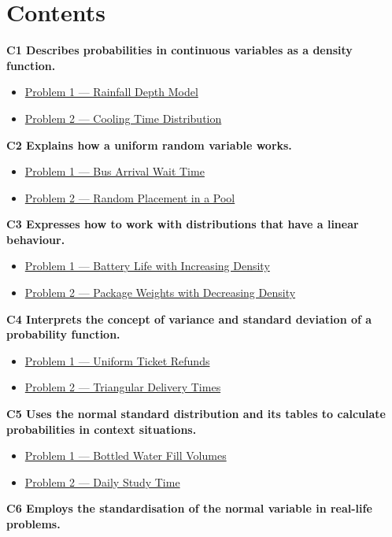 


	
	\section*{Contents}
	\noindent\textbf{C1 Describes probabilities in continuous variables as a density function.}
	\begin{itemize}
		\item \hyperlink{c1-ex1}{Problem 1 — Rainfall Depth Model}
		\item \hyperlink{c1-ex2}{Problem 2 — Cooling Time Distribution}
	\end{itemize}
	\noindent\textbf{C2 Explains how a uniform random variable works.}
	\begin{itemize}
		\item \hyperlink{c2-ex1}{Problem 1 — Bus Arrival Wait Time}
		\item \hyperlink{c2-ex2}{Problem 2 — Random Placement in a Pool}
	\end{itemize}
	\noindent\textbf{C3 Expresses how to work with distributions that have a linear behaviour.}
	\begin{itemize}
		\item \hyperlink{c3-ex1}{Problem 1 — Battery Life with Increasing Density}
		\item \hyperlink{c3-ex2}{Problem 2 — Package Weights with Decreasing Density}
	\end{itemize}
	\noindent\textbf{C4 Interprets the concept of variance and standard deviation of a probability function.}
	\begin{itemize}
		\item \hyperlink{c4-ex1}{Problem 1 — Uniform Ticket Refunds}
		\item \hyperlink{c4-ex2}{Problem 2 — Triangular Delivery Times}
	\end{itemize}
	\noindent\textbf{C5 Uses the normal standard distribution and its tables to calculate probabilities in context situations.}
	\begin{itemize}
		\item \hyperlink{c5-ex1}{Problem 1 — Bottled Water Fill Volumes}
		\item \hyperlink{c5-ex2}{Problem 2 — Daily Study Time}
	\end{itemize}
	\noindent\textbf{C6 Employs the standardisation of the normal variable in real-life problems.}
